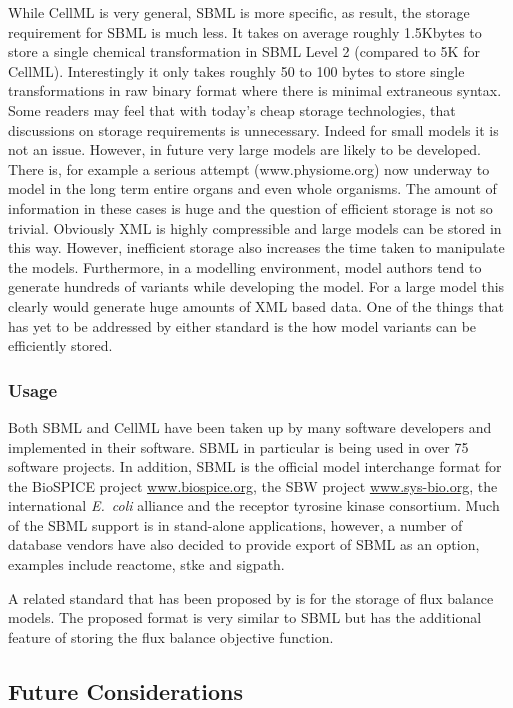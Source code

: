 \documentclass[12pt]{article}
\begin{document}
While CellML is very general, SBML is more specific, as result,
the storage requirement for SBML is much less. It takes on average
roughly 1.5Kbytes to store a single chemical transformation in SBML
Level 2 (compared to 5K for CellML). Interestingly it only takes
roughly 50 to 100 bytes to store single transformations in raw
binary format where there is minimal extraneous syntax. Some
readers may feel that with today's cheap storage technologies,
that discussions on storage requirements is unnecessary. Indeed
for small models it is not an issue. However, in future very large
models are likely to be developed. There is, for example a serious
attempt (www.physiome.org) now underway to model in the
long term entire organs and even whole organisms. The amount of
information in these cases is huge and the question of efficient
storage is not so trivial. Obviously XML is highly compressible
and large models can be stored in this way. However, inefficient
storage also increases the time taken to manipulate the models.
Furthermore, in a modelling environment, model authors tend to
generate hundreds of variants while developing the model. For a
large model this clearly would generate huge amounts of XML based
data. One of the things that has yet to be addressed by either
standard is the how model variants can be efficiently stored.

\subsubsection{Usage}

Both SBML and CellML have been taken up by many software developers and implemented in their software. SBML in particular is being used in over 75 software projects. In addition, SBML is the official model interchange format for the BioSPICE project \url{www.biospice.org}, the SBW project \url{www.sys-bio.org}, the international {\em E.\ coli} alliance and the receptor tyrosine kinase consortium. Much of the SBML support is in stand-alone applications, however, a number of database vendors have also decided to provide export of SBML as an option, examples include reactome, stke and sigpath.

A related standard that has been proposed by \cite{MFAML2004} is
for the storage of flux balance models. The proposed format is
very similar to SBML but has the additional feature of storing the
flux balance objective function.

\subsection{Future Considerations}
\end{document}
